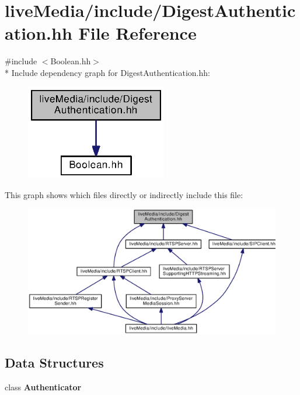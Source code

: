 \section{live\+Media/include/\+Digest\+Authentication.hh File Reference}
\label{DigestAuthentication_8hh}
{\ttfamily \#include $<$Boolean.\+hh$>$}\\*
Include dependency graph for Digest\+Authentication.\+hh\+:
\nopagebreak
\begin{figure}[H]
\begin{center}
\leavevmode
\includegraphics[width=175pt]{DigestAuthentication_8hh__incl}
\end{center}
\end{figure}
This graph shows which files directly or indirectly include this file\+:
\nopagebreak
\begin{figure}[H]
\begin{center}
\leavevmode
\includegraphics[width=350pt]{DigestAuthentication_8hh__dep__incl}
\end{center}
\end{figure}
\subsection*{Data Structures}
\begin{DoxyCompactItemize}
\item 
class {\bf Authenticator}
\end{DoxyCompactItemize}
